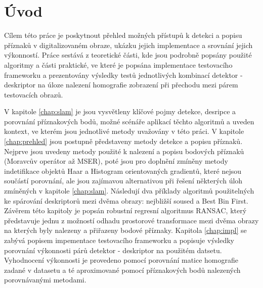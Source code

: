

\chapter{Úvod}

Cílem této práce je poskytnout přehled možných přístupů k detekci a popisu příznaků v digitalizovaném obraze, ukázku jejich implementace a srovnání jejich výkonností. Práce sestává z teoretické části, kde jsou podrobně popsány použité algoritmy a části praktické, ve které je popsána implementace testovacího frameworku a prezentovány výsledky testů jednotlivých kombinací detektor - deskriptor na úloze nalezení homografie zobrazení při přechodu mezi párem testovacích obrazů.

V kapitole \ref{chap:slam} je jsou vysvětleny klíčové pojmy detekce, desripce a porovnání příznakových bodů, možné scénáře aplikací těchto algoritmů a uveden kontext, ve kterém jsou jednotlivé metody uvažovány v této práci. V kapitole \ref{chap:prehled} jsou postupně představeny metody detekce a popisu příznaků. Nejprve jsou uvedeny metody použité k nalezení a popisu bodových příznaků (Moravcův operátor až MSER), poté jsou pro doplnění zmíněny metody indetifikace objektů Haar a Histogram orientovaných gradientů, které nejsou součástí porovnání, ale jsou zajímavou alternativou při řešení některých úloh zmíněných v kapitole \ref{chap:slam}. Následují dva příklady algoritmů použitelných ke spárování deskriptorů mezi dvěma obrazy: nejbližší soused a Best Bin First. Závěrem této kapitoly je popsán robustní regresní algoritmus RANSAC, který představuje jednu z možností odhadu prostorové transformace mezi dvěma obrazy na kterých byly nalezeny a přiřazeny bodové příznaky. Kapitola \ref{chap:impl} se zabývá popisem impementace testovacího frameworku a popisuje výsledky porovnání výkonnosti párů detektor - deskriptor na použitém datsetu. Vyhodnocení výkonnosti je provedeno pomocí porovnání matice homografie zadané v datasetu a té aproximované pomocí příznakových bodů nalezených porovnávanými metodami.

